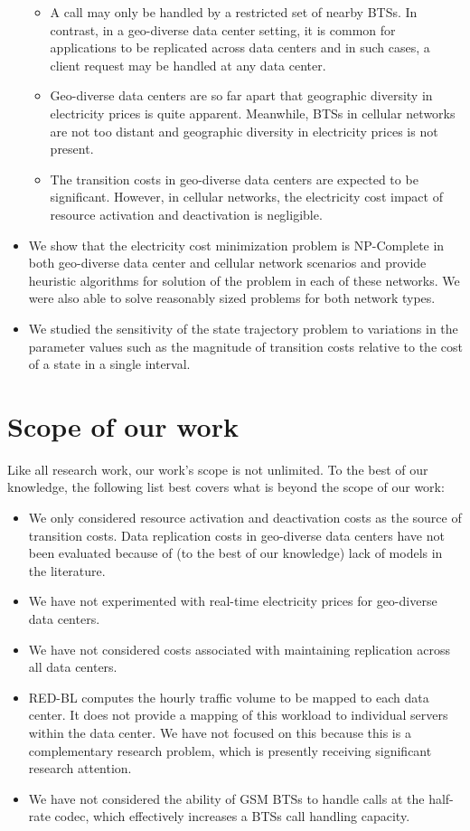\begin{itemize}
\begin{itemize}
	\item A call may only be handled by a restricted set of nearby BTSs. In contrast, in a geo-diverse data center setting, it is common for applications to be replicated across data centers and in such cases, a client request may be handled at any data center.
	\item Geo-diverse data centers are so far apart that geographic diversity in electricity prices is quite apparent. Meanwhile, BTSs in cellular networks are not too distant and geographic diversity in electricity prices is not present.
	\item The transition costs in geo-diverse data centers are expected to be significant. However, in cellular networks, the electricity cost impact of resource activation and deactivation is negligible.
	\end{itemize}
\item We show that the electricity cost minimization problem is NP-Complete in both geo-diverse data center and cellular network scenarios and provide heuristic algorithms for solution of the problem in each of these networks. We were also able to solve reasonably sized problems for both network types.
\item We studied the sensitivity of the state trajectory problem to variations in the parameter values such as the magnitude of transition costs relative to the cost of a state in a single interval.
\end{itemize}

\section{Scope of our work} Like all research work, our work's scope is not unlimited. To the best of our knowledge, the following list best covers what is beyond the scope of our work:
\begin{itemize}
\item We only considered resource activation and deactivation costs as the source of transition costs. Data replication costs in geo-diverse data centers have not been evaluated because of (to the best of our knowledge) lack of models in the literature. 
\item We have not experimented with real-time electricity prices for geo-diverse data centers.
\item We have not considered costs associated with maintaining replication across all data centers.
\item RED-BL computes the hourly traffic volume to be mapped to each data center. It does not provide a mapping of this workload to individual servers within the data center. We have not focused on this because this is a complementary research problem, which is presently receiving significant research attention.
\item We have not considered the ability of GSM BTSs to handle calls at the half-rate codec, which effectively increases a BTSs call handling capacity.
\end{itemize}

